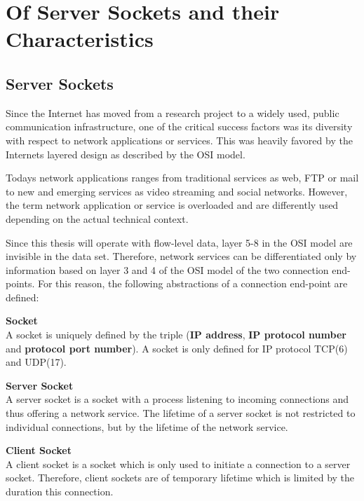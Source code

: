 \chapter{Of Server Sockets and their Characteristics 
\label{chapter:sockets}}

\section{Server Sockets} 
Since the Internet has moved from a research project to
a widely used, public communication infrastructure, one of the critical success
factors was its diversity with respect to network applications or services. This
was heavily favored by the Internets layered design as described by the OSI
model. 

Todays network applications ranges from traditional services as web, FTP or mail
to new and emerging services as video streaming and social networks. However,
the term network application or service is overloaded and are differently used
depending on the actual technical context.

Since this thesis will operate with flow-level data, layer 5-8 in the OSI model
are invisible in the data set. Therefore, network services can be differentiated
only by information based on layer 3 and 4 of the OSI model of the two
connection end-points. For this reason, the following abstractions of a
connection end-point are defined:

\parbox{\textwidth}{
	\begin{defn}{\textbf{Socket}\\}
		A socket is uniquely defined by the triple (\textbf{IP address}, 
		\textbf{IP protocol number} and \textbf{protocol port number}). A socket 
		is only defined for IP protocol TCP(6) and UDP(17).
	\end{defn}
}

\parbox{\textwidth}{
	\begin{defn}{\textbf{Server Socket\label{def:serversocket}}\\} 
		A server socket is a socket with a process listening to incoming 
		connections and thus offering a network service. The lifetime of a 
		server socket is not restricted to individual connections, but by the 
		lifetime of the network service.
	\end{defn}
}

\parbox{\textwidth}{
	\begin{defn}{\textbf{Client Socket}\\}
		A client socket is a socket which is only used to initiate a  connection 
		to a server socket. Therefore, client sockets are of temporary lifetime 
		which is limited by the duration this connection.
	\end{defn}
}

